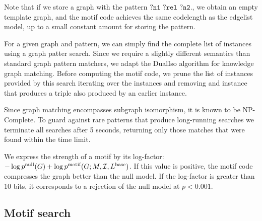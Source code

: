 \documentclass[letterpaper]{article} %
\newcommand{\I}{{\cal I}}
\begin{document}
Note that if we store a graph with the pattern $\texttt{?n1 ?rel ?n2.}$, we obtain an empty template graph, and the motif code achieves the same codelength as the edgelist model, up to a small constant amount for storing the pattern.
 

For a given graph and pattern, we can simply find the complete list of instances using a graph patter search. Since we require a slightly different semantics than standard graph pattern matchers, we adapt the DualIso algorithm \cite{saltz2014dualiso} for knowledge graph matching. Before computing the motif code, we prune the list of instances provided by this search iterating over the instances and removing and instance that produces a triple also produced by an earlier instance.

Since graph matching encompasses subgraph isomorphism, it is known to be NP-Complete. To guard against rare patterns that produce long-running searches we terminate all searches after 5 seconds, returning  only those matches that were found within the time limit.

We express the strength of a motif by its log-factor: $-\log p^\text{null}(G) + \log p^\text{motif}(G; M, \I, L^\text{base})$. If this value is positive, the motif code compresses the graph better than the null model. If the log-factor is greater than 10 bits, it corresponds to a rejection of the null model at $p < 0.001$.

\subsection{Motif search}

\label{section:search}
\end{document}
